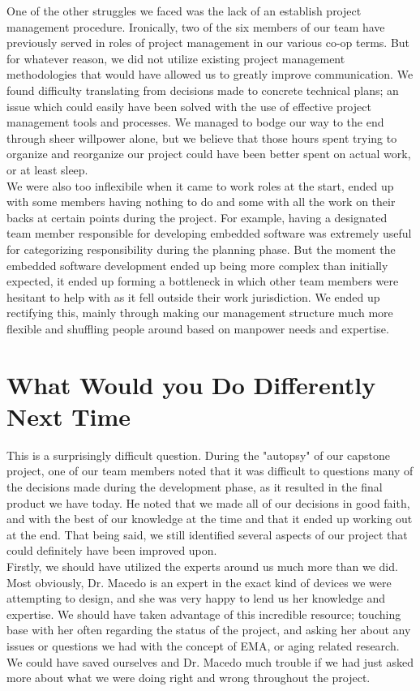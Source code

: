 \documentclass{article}
\begin{document}
One of the other struggles we faced was the lack of an establish project management procedure. Ironically, two of the six members of our team have previously served in roles of project management in our various co-op terms. But for whatever reason, we did not utilize existing project management methodologies that would have allowed us to greatly improve communication. We found difficulty translating from decisions made to concrete technical plans; an issue which could easily have been solved with the use of effective project management tools and processes. We managed to bodge our way to the end through sheer willpower alone, but we believe that those hours spent trying to organize and reorganize our project could have been better spent on actual work, or at least sleep.\\

We were also too inflexibile when it came to work roles at the start, ended up with some members having nothing to do and some with all the work on their backs at certain points during the project. For example, having a designated team member responsible for developing embedded software was extremely useful for categorizing responsibility during the planning phase. But the moment the embedded software development ended up being more complex than initially expected, it ended up forming a bottleneck in which other team members were hesitant to help with as it fell outside their work jurisdiction. We ended up rectifying this, mainly through making our management structure much more flexible and shuffling people around based on manpower needs and expertise.\\

\section{What Would you Do Differently Next Time}

This is a surprisingly difficult question. During the "autopsy" of our capstone project, one of our team members noted that it was difficult to questions many of the decisions made during the development phase, as it resulted in the final product we have today. He noted that we made all of our decisions in good faith, and with the best of our knowledge at the time and that it ended up working out at the end. That being said, we still identified several aspects of our project that could definitely have been improved upon.\\

Firstly, we should have utilized the experts around us much more than we did. Most obviously, Dr. Macedo is an expert in the exact kind of devices we were attempting to design, and she was very happy to lend us her knowledge and expertise. We should have taken advantage of this incredible resource; touching base with her often regarding the status of the project, and asking her about any issues or questions we had with the concept of EMA, or aging related research. We could have saved ourselves and Dr. Macedo much trouble if we had just asked more about what we were doing right and wrong throughout the project. \\
\end{document}
